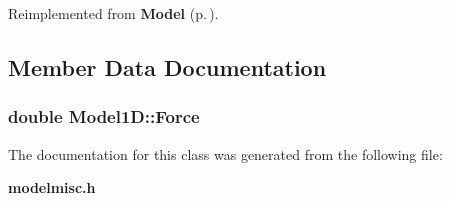 Reimplemented from {\bf Model} {\rm (p.\,\pageref{class_Model_a3})}.

\subsection{Member Data Documentation}
\subsubsection{\setlength{\rightskip}{0pt plus 5cm}double Model1D::Force}\label{class_Model1D_m0}




The documentation for this class was generated from the following file:\begin{CompactItemize}
\item 
{\bf modelmisc.h}\end{CompactItemize}
